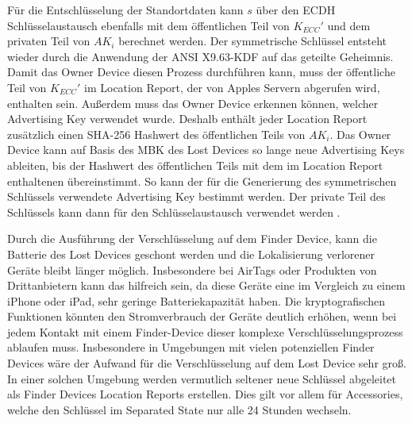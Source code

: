 Für die Entschlüsselung der Standortdaten kann $s$ über den \ac{ECDH} Schlüsselaustausch ebenfalls mit dem öffentlichen Teil von $K_{ECC}'$ und dem privaten Teil von $AK_i$ berechnet werden.
Der symmetrische Schlüssel entsteht wieder durch die Anwendung der ANSI X9.63-\ac{KDF} auf das geteilte Geheimnis.
Damit das Owner Device diesen Prozess durchführen kann, muss der öffentliche Teil von $K_{ECC}'$ im Location Report, der von Apples Servern abgerufen wird, enthalten sein.
Außerdem muss das Owner Device erkennen können, welcher Advertising Key verwendet wurde.
Deshalb enthält jeder Location Report zusätzlich einen \ac{SHA}-256 Hashwert des öffentlichen Teils von $AK_i$.
Das Owner Device kann auf Basis des \ac{MBK} des Lost Devices so lange neue Advertising Keys ableiten, bis der Hashwert des öffentlichen Teils mit dem im Location Report enthaltenen übereinstimmt.
So kann der für die Generierung des symmetrischen Schlüssels verwendete Advertising Key bestimmt werden.
Der private Teil des Schlüssels kann dann für den Schlüsselaustausch verwendet werden \cite{Heinrich_FindMy}.


Durch die Ausführung der Verschlüsselung auf dem Finder Device, kann die Batterie des Lost Devices geschont werden und die Lokalisierung verlorener Geräte bleibt länger möglich.
Insbesondere bei AirTags oder Produkten von Drittanbietern kann das hilfreich sein, da diese Geräte eine im Vergleich zu einem iPhone oder iPad, sehr geringe Batteriekapazität haben.
Die kryptografischen Funktionen könnten den Stromverbrauch der Geräte deutlich erhöhen, wenn bei jedem Kontakt mit einem Finder-Device dieser komplexe Verschlüsselungsprozess ablaufen muss.
Insbesondere in Umgebungen mit vielen potenziellen Finder Devices wäre der Aufwand für die Verschlüsselung auf dem Lost Device sehr groß.
In einer solchen Umgebung werden vermutlich seltener neue Schlüssel abgeleitet als Finder Devices Location Reports erstellen.
Dies gilt vor allem für Accessories, welche den Schlüssel im Separated State nur alle 24 Stunden wechseln.

